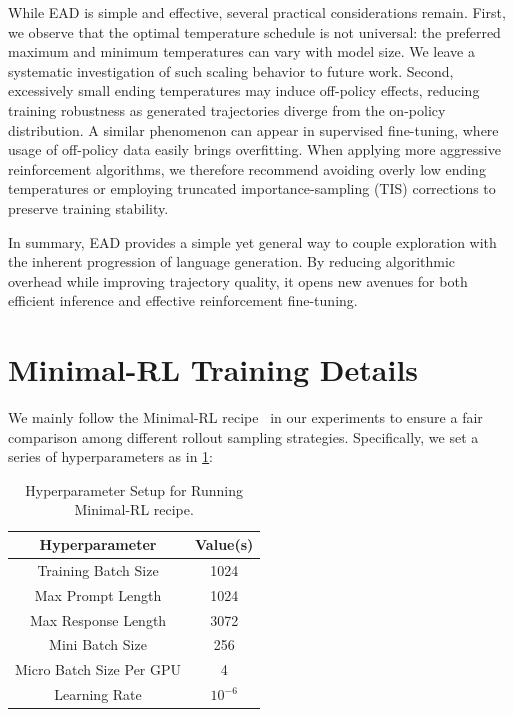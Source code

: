 \documentclass{article} %
\begin{document}
While EAD is simple and effective, several practical considerations remain. First, we observe that the optimal temperature schedule is not universal: the preferred maximum and minimum temperatures can vary with model size. We leave a systematic investigation of such scaling behavior to future work. Second, excessively small ending temperatures may induce off-policy effects, reducing training robustness as generated trajectories diverge from the on-policy distribution. A similar phenomenon can appear in supervised fine-tuning, where usage of off-policy data easily brings overfitting. 
When applying more aggressive reinforcement algorithms, we therefore recommend avoiding overly low ending temperatures or employing truncated importance-sampling (TIS) corrections to preserve training stability.

In summary, EAD provides a simple yet general way to couple exploration with the inherent progression of language generation. By reducing algorithmic overhead while improving trajectory quality, it opens new avenues for both efficient inference and effective reinforcement fine-tuning.





\newpage
\appendix
\section{Minimal-RL Training Details}
\label{app: minimal_rl_training_details}
We mainly follow the Minimal-RL recipe~\citep{xiong2025minimalist} in our experiments to ensure a fair comparison among different rollout sampling strategies. Specifically, we set a series of hyperparameters as in \cref{tab: hyperparameter}:

\begin{table}[h!]
\centering
\begin{tabular}{@{}cc@{}}
\toprule
Hyperparameter                                 & Value(s)        \\ 
\midrule
\multicolumn{1}{c}{Training Batch Size}      & \multicolumn{1}{c}{1024} \\ 
\multicolumn{1}{c}{Max Prompt Length}        & \multicolumn{1}{c}{1024} \\ 
\multicolumn{1}{c}{Max Response Length}      & \multicolumn{1}{c}{3072} \\ 
\multicolumn{1}{c}{Mini Batch Size}          & \multicolumn{1}{c}{256}  \\ 
\multicolumn{1}{c}{Micro Batch Size Per GPU} & \multicolumn{1}{c}{4}    \\ 
\multicolumn{1}{c}{Learning Rate}            & \multicolumn{1}{c}{$10^{-6}$} \\ 
\bottomrule
\end{tabular}%
\caption{Hyperparameter Setup for Running Minimal-RL recipe. }
\label{tab: hyperparameter}
\end{table}
\end{document}

